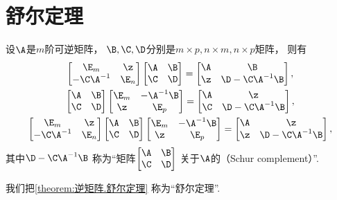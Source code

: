 \section{舒尔定理}
\begin{theorem}\label{theorem:逆矩阵.舒尔定理}
设\(\A\)是\(m\)阶可逆矩阵，
\(\B,\C,\D\)分别是\(m \times p, n \times m, n \times p\)矩阵，
则有\begin{gather}
	\begin{bmatrix}
		\E_m & \z \\
		-\C\A^{-1} & \E_n
	\end{bmatrix}
	\begin{bmatrix}
		\A & \B \\
		\C & \D
	\end{bmatrix}
	= \begin{bmatrix}
		\A & \B \\
		\z & \D - \C \A^{-1} \B
	\end{bmatrix},
	\\
	\begin{bmatrix}
		\A & \B \\
		\C & \D
	\end{bmatrix}
	\begin{bmatrix}
		\E_m & -\A^{-1} \B \\
		\z & \E_p
	\end{bmatrix}
	= \begin{bmatrix}
		\A & \z \\
		\C & \D - \C \A^{-1} \B
	\end{bmatrix},
	\\
	\begin{bmatrix}
		\E_m & \z \\
		-\C \A^{-1} & \E_n
	\end{bmatrix}
	\begin{bmatrix}
		\A & \B \\
		\C & \D
	\end{bmatrix}
	\begin{bmatrix}
		\E_m & -\A^{-1} \B \\
		\z & \E_p
	\end{bmatrix}
	= \begin{bmatrix}
		\A & \z \\
		\z & \D - \C \A^{-1} \B
	\end{bmatrix},
\end{gather}
\rm
其中\(\D - \C \A^{-1} \B\)
称为“矩阵\(\begin{bmatrix}
	\A & \B \\
	\C & \D
\end{bmatrix}\)
关于\(\A\)的（Schur complement）”.
\end{theorem}
我们把\cref{theorem:逆矩阵.舒尔定理} 称为“舒尔定理”.

